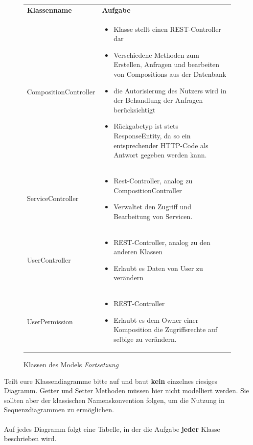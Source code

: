 \begin{figure}[h]
	\begin{tabularx}{\textwidth}{p{} | X}
		\rowcolor[HTML]{C0C0C0}
		\textbf{Klassenname} & \textbf{Aufgabe} \\
		CompositionController & \begin{itemize}
		\item Klasse stellt einen REST-Controller dar
		\item Verschiedene Methoden zum Erstellen, Anfragen und bearbeiten von Compositions aus der Datenbank
		\item die Autorisierung des Nutzers wird in der Behandlung der Anfragen berücksichtigt
		\item Rückgabetyp ist stets ResponseEntity, da so ein entsprechender HTTP-Code als Antwort gegeben werden kann.
		\end{itemize}\\
		\rowcolor[HTML]{E7E7E7}
		ServiceController & \begin{itemize}
			\item Rest-Controller, analog zu CompositionController
			\item Verwaltet den Zugriff und Bearbeitung von Servicen.
		\end{itemize}\\
		UserController & \begin{itemize}
			\item REST-Controller, analog zu den anderen Klassen
			\item Erlaubt es Daten von User zu verändern
		\end{itemize}\\
		\rowcolor[HTML]{E7E7E7}
		UserPermission & \begin{itemize}
			\item REST-Controller
			\item Erlaubt es dem Owner einer Komposition die Zugriffsrechte auf selbige zu verändern.
		\end{itemize}
	\end{tabularx}
	\caption{Klassen des Models \textit{Fortsetzung}}
\end{figure}

\begin{tcolorbox}
Teilt eure Klassendiagramme bitte auf und baut \textbf{kein} einzelnes riesiges Diagramm.
Getter und Setter Methoden müssen hier nicht modelliert werden.
Sie sollten aber der klassischen Namenskonvention folgen, um die Nutzung in Sequenzdiagrammen zu ermöglichen.
\\\\
Auf jedes Diagramm folgt eine Tabelle, in der die Aufgabe \textbf{jeder} Klasse beschrieben wird.
\end{tcolorbox}

